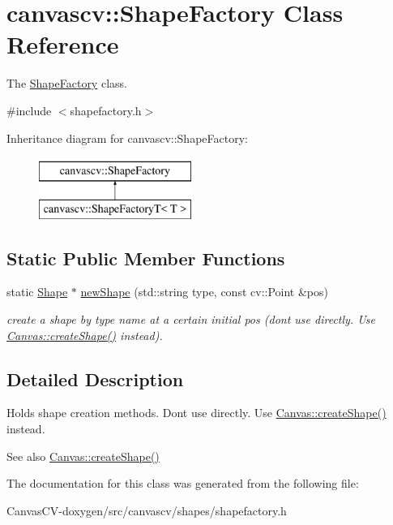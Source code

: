 \hypertarget{classcanvascv_1_1ShapeFactory}{}\section{canvascv\+:\+:Shape\+Factory Class Reference}
\label{classcanvascv_1_1ShapeFactory}


The \hyperlink{classcanvascv_1_1ShapeFactory}{Shape\+Factory} class.  




{\ttfamily \#include $<$shapefactory.\+h$>$}

Inheritance diagram for canvascv\+:\+:Shape\+Factory\+:\begin{figure}[H]
\begin{center}
\leavevmode
\includegraphics[height=2.000000cm]{classcanvascv_1_1ShapeFactory}
\end{center}
\end{figure}
\subsection*{Static Public Member Functions}
\begin{DoxyCompactItemize}
\item 
static \hyperlink{classcanvascv_1_1Shape}{Shape} $\ast$ \hyperlink{classcanvascv_1_1ShapeFactory_ac21c83f31513026566111cad2a63d359}{new\+Shape} (std\+::string type, const cv\+::\+Point \&pos)\hypertarget{classcanvascv_1_1ShapeFactory_ac21c83f31513026566111cad2a63d359}{}\label{classcanvascv_1_1ShapeFactory_ac21c83f31513026566111cad2a63d359}

\begin{DoxyCompactList}\small\item\em create a shape by type name at a certain initial pos (don\textquotesingle{}t use directly. Use \hyperlink{classcanvascv_1_1Canvas_a630ac92458f1718d0c597e96dd5a4aef}{Canvas\+::create\+Shape()} instead). \end{DoxyCompactList}\end{DoxyCompactItemize}


\subsection{Detailed Description}
Holds shape creation methods. Don\textquotesingle{}t use directly. Use \hyperlink{classcanvascv_1_1Canvas_a630ac92458f1718d0c597e96dd5a4aef}{Canvas\+::create\+Shape()} instead. \begin{DoxySeeAlso}{See also}
\hyperlink{classcanvascv_1_1Canvas_a630ac92458f1718d0c597e96dd5a4aef}{Canvas\+::create\+Shape()} 
\end{DoxySeeAlso}


The documentation for this class was generated from the following file\+:\begin{DoxyCompactItemize}
\item 
Canvas\+C\+V-\/doxygen/src/canvascv/shapes/shapefactory.\+h\end{DoxyCompactItemize}
